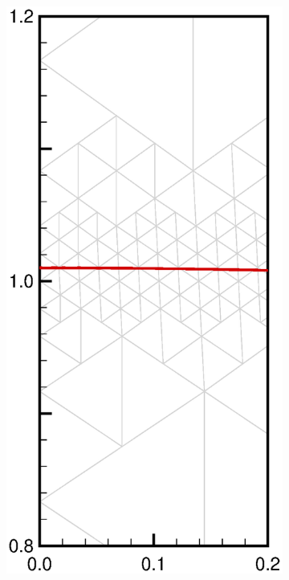 \documentclass[11pt,a4paper,twoside]{article}
\begin{document}
\begin{figure}[ht!]
\begin{center}
\begin{subfigure}[]{0.25\textwidth}
				\caption{}
			\end{subfigure}
			~
			\begin{subfigure}[]{0.25\textwidth}
				\includegraphics[width=\textwidth]{StandingWave_N3_a01_zoom.eps}

\end{subfigure}
\end{center}
\end{figure}
\end{document}

